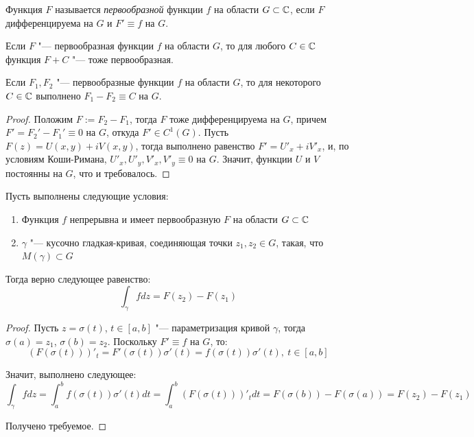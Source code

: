 \begin{definition}
	Функция $F$ называется \textit{первообразной} функции $f$ на области $G \subset \mathbb{C}$, если $F$ дифференцируема на $G$ и $F' \equiv f$ на $G$.
\end{definition}

\begin{note}
	Если $F$ "--- первообразная функции $f$ на области $G$, то для любого $C \in \mathbb{C}$ функция $F + C$ "--- тоже первообразная.
\end{note}

\begin{proposition}
	Если $F_1, F_2$ "--- первообразные функции $f$ на области $G$, то для некоторого $C \in \mathbb{C}$ выполнено $F_1 - F_2 \equiv C$ на $G$.
\end{proposition}

\begin{proof}
	Положим $F := F_2 - F_1$, тогда $F$ тоже дифференцируема на $G$, причем $F' = F_2' - F_1' \equiv 0$ на $G$, откуда $F' \in C^1(G)$. Пусть $F(z) = U(x, y) + iV(x, y)$, тогда выполнено равенство $F' = U'_x +iV'_x$, и, по условиям Коши-Римана, $U'_x, U'_y, V'_x, V'_y \equiv 0$ на $G$. Значит, функции $U$ и $V$ постоянны на $G$, что и требовалось.
\end{proof}

\begin{proposition}
	Пусть выполнены следующие условия:
	\begin{enumerate}
		\item Функция $f$ непрерывна и имеет первообразную $F$ на области $G \subset \mathbb{C}$
		\item $\gamma$ "--- кусочно гладкая-кривая, соединяющая точки $z_1, z_2 \in G$, такая, что $M(\gamma) \subset G$
	\end{enumerate}
	
	Тогда верно следующее равенство:
	\[\int_{\gamma}fdz = F(z_2) - F(z_1)\]
\end{proposition}

\begin{proof}
	Пусть $z = \sigma(t)$, $t \in [a, b]$ "--- параметризация кривой $\gamma$, тогда $\sigma(a) = z_1$, $\sigma(b) = z_2$. Поскольку $F' \equiv f$ на $G$, то:
	\[ (F(\sigma(t)))'_t = F'(\sigma(t))\sigma'(t) = f(\sigma(t))\sigma'(t),~t \in [a, b]\]
	
	Значит, выполнено следующее:
	\[\int_\gamma fdz = \int_a^b f(\sigma(t))\sigma'(t)dt = \int_a^b (F(\sigma(t)))'_t dt = F(\sigma(b)) - F(\sigma(a)) = F(z_2) - F(z_1)\]
	
	Получено требуемое.
\end{proof}

